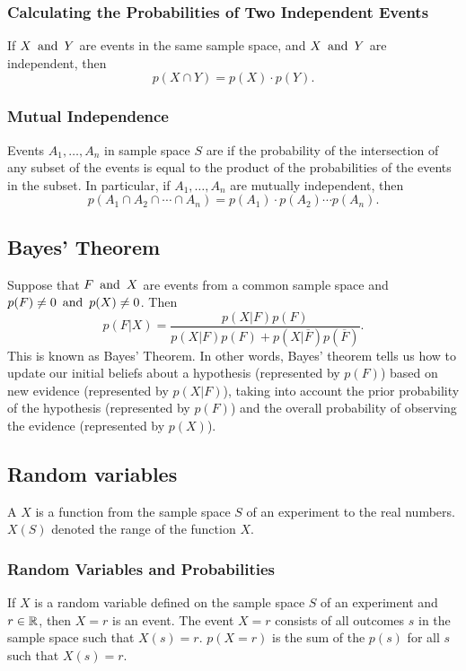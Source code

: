 \subsubsection*{Calculating the Probabilities of Two Independent Events}
If $X \operatorname{~\text{and}~} Y$ are events in the same sample space, and $X \operatorname{~\text{and}~} Y$ are independent, then
\[
  p(X \cap Y) = p(X) \cdot p(Y).
\]

\subsubsection*{Mutual Independence}
Events $A_1,\ldots,A_n$ in sample space $S$ are  if the probability of the intersection of any subset of the events is equal to the product of the probabilities of the events in the subset. In particular, if $A_1,\ldots,A_n$ are mutually independent, then
\[
  p(A_1 \cap A_2 \cap \cdots \cap A_n) = p(A_1) \cdot p(A_2) \cdots p(A_n).
\]

\subsection{Bayes' Theorem}
Suppose that $F \operatorname{~\text{and}~} X$ are events from a common sample space and $p(F) \neq 0 \operatorname{~\text{and}~} p(X) \neq 0$. Then
\[
  p(F|X) = \frac{p(X|F)p(F)}{p(X|F)p(F) + p(X|\overline{F})p(\overline{F})}.
\]
This is known as Bayes' Theorem. In other words, Bayes' theorem tells us how to update our initial beliefs about a hypothesis (represented by $p(F)$) based on new evidence (represented by $p(X|F)$), taking into account the prior probability of the hypothesis (represented by $p(F)$) and the overall probability of observing the evidence (represented by $p(X)$).

\subsection{Random variables}
A  $X$ is a function from the sample space $S$ of an experiment to the real numbers. $X(S)$ denoted the range of the function $X$.

\subsubsection*{Random Variables and Probabilities}
If $X$ is a random variable defined on the sample space $S$ of an experiment and $r \in \mathbb{R}$, then $X = r$ is an event. The event $X =r $ consists of all outcomes $s$ in the sample space such that $X(s) = r$. $p(X=r)$ is the sum of the $p(s)$ for all $s$ such that $X(s) = r$.

